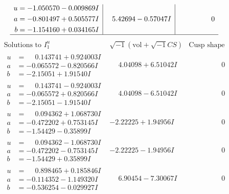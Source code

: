 \documentclass[1p]{elsarticle_modified}
\theoremstyle{definition}
\newcommand{\I}{\sqrt{-1}}
\begin{document}
$$\begin{array}{c|c|c}
\begin{aligned}
u &= -1.050570 - 0.009869 I \\
a &= -0.801497 + 0.505577 I \\
b &= -1.154160 + 0.034165 I\end{aligned}
 & \phantom{-}5.42694 - 0.57047 I & \phantom{-0.000000 } 0\\
 \hline 
 \end{array}$$\newpage$$\begin{array}{c|c|c}  
\text{Solutions to }I^u_{1}& \I (\text{vol} + \sqrt{-1}CS) & \text{Cusp shape}\\
 \hline 
\begin{aligned}
u &= \phantom{-}0.143741 + 0.924003 I \\
a &= -0.065572 - 0.820566 I \\
b &= -2.15051 + 1.91540 I\end{aligned}
 & \phantom{-}4.04098 + 6.51042 I & \phantom{-0.000000 } 0 \\ \hline\begin{aligned}
u &= \phantom{-}0.143741 - 0.924003 I \\
a &= -0.065572 + 0.820566 I \\
b &= -2.15051 - 1.91540 I\end{aligned}
 & \phantom{-}4.04098 - 6.51042 I & \phantom{-0.000000 } 0 \\ \hline\begin{aligned}
u &= \phantom{-}0.094362 + 1.068730 I \\
a &= -0.472202 + 0.753145 I \\
b &= -1.54429 - 0.35899 I\end{aligned}
 & -2.22225 + 1.94956 I & \phantom{-0.000000 } 0 \\ \hline\begin{aligned}
u &= \phantom{-}0.094362 - 1.068730 I \\
a &= -0.472202 - 0.753145 I \\
b &= -1.54429 + 0.35899 I\end{aligned}
 & -2.22225 - 1.94956 I & \phantom{-0.000000 } 0 \\ \hline\begin{aligned}
u &= \phantom{-}0.898465 + 0.185846 I \\
a &= -0.114352 - 1.149320 I \\
b &= -0.536254 - 0.029927 I\end{aligned}
 & \phantom{-}6.90454 - 7.30067 I & \phantom{-0.000000 } 0 \\ \hline\begin{aligned}

\end{aligned}
\end{array}$$
\end{document}
